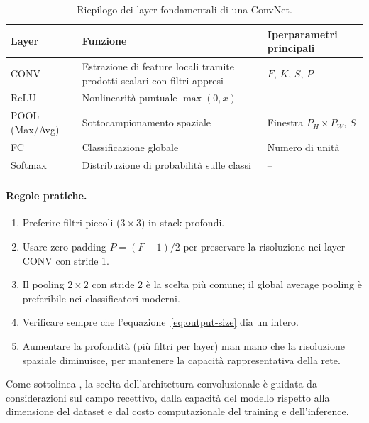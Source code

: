 \begin{table}[H]
  \centering
  \caption{Riepilogo dei layer fondamentali di una ConvNet.}
  \label{tab:cnn-summary}
  \small
  \begin{tabular}{p{2.8cm}p{5.2cm}p{4.2cm}}
    \toprule
    \textbf{Layer} & \textbf{Funzione} & \textbf{Iperparametri principali} \\
    \midrule
    CONV            & Estrazione di feature locali tramite
                      prodotti scalari con filtri appresi &
                      $F$, $K$, $S$, $P$ \\
    \addlinespace
    ReLU            & Nonlinearità puntuale $\max(0,x)$ & -- \\
    \addlinespace
    POOL (Max/Avg)  & Sottocampionamento spaziale &
                      Finestra $P_H\times P_W$, $S$ \\
    \addlinespace
    FC              & Classificazione globale & Numero di unità \\
    \addlinespace
    Softmax         & Distribuzione di probabilità sulle classi & -- \\
    \bottomrule
  \end{tabular}
\end{table}

\paragraph{Regole pratiche.}
\begin{enumerate}
  \item Preferire filtri piccoli ($3 \times 3$) in stack profondi.
  \item Usare zero-padding $P = (F-1)/2$ per preservare la risoluzione nei layer CONV con
        stride 1.
  \item Il pooling $2 \times 2$ con stride 2 è la scelta più comune; il global average
        pooling è preferibile nei classificatori moderni.
  \item Verificare sempre che l'equazione~\eqref{eq:output-size} dia un intero.
  \item Aumentare la profondità (più filtri per layer) man mano che la risoluzione spaziale
        diminuisce, per mantenere la capacità rappresentativa della rete.
\end{enumerate}

Come sottolinea \citet{bishop2024}, la scelta dell'architettura convoluzionale è guidata da
considerazioni sul campo recettivo, dalla capacità del modello rispetto alla dimensione del
dataset e dal costo computazionale del training e dell'inference.

